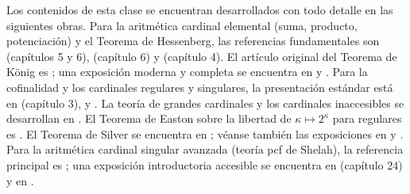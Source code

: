 Los contenidos de esta clase se encuentran desarrollados con todo detalle en las siguientes obras. Para la aritmética cardinal elemental (suma, producto, potenciación) y el Teorema de Hessenberg, las referencias fundamentales son \cite{jech2003} (capítulos 5 y 6), \cite{enderton1977} (capítulo 6) y \cite{hrbacek1999} (capítulo 4). El artículo original del Teorema de König es \cite{konig1905}; una exposición moderna y completa se encuentra en \cite{jech2003} y \cite{kunen2011}. Para la cofinalidad y los cardinales regulares y singulares, la presentación estándar está en \cite{jech2003} (capítulo 3), \cite{kunen2011} y \cite{levy1979}. La teoría de grandes cardinales y los cardinales inaccesibles se desarrollan en \cite{kanamori2003}. El Teorema de Easton sobre la libertad de $\kappa \mapsto 2^\kappa$ para regulares es \cite{easton1970}. El Teorema de Silver se encuentra en \cite{silver1975}; véanse también las exposiciones en \cite{jech2003} y \cite{devlin1993}. Para la aritmética cardinal singular avanzada (teoría pcf de Shelah), la referencia principal es \cite{shelah1994}; una exposición introductoria accesible se encuentra en \cite{jech2003} (capítulo 24) y en \cite{kanamori2003}.

\nocite{sierpinski1958, suppes1972, halmos1960}
